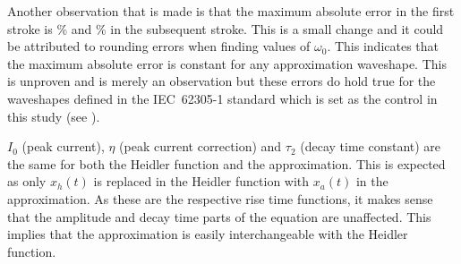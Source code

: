 Another observation that is made is that the maximum absolute error in the first stroke is \unskip \% and \unskip \% in the subsequent stroke. This is a small change and it could be attributed to rounding errors when finding values of $\omega_0$. This indicates that the maximum absolute error is constant for any approximation waveshape. This is unproven and is merely an observation but these errors do hold true for the waveshapes defined in the IEC~62305-1 standard which is set as the control in this study (see ).

$I_0$ (peak current), $\eta$ (peak current correction) and $\tau_2$ (decay time constant) are the same for both the Heidler function and the approximation. This is expected as only $x_h \left( t \right)$ is replaced in the Heidler function with $x_a \left( t \right)$ in the approximation. As these are the respective rise time functions, it makes sense that the amplitude and decay time parts of the equation are unaffected. This implies that the approximation is easily interchangeable with the Heidler function.

